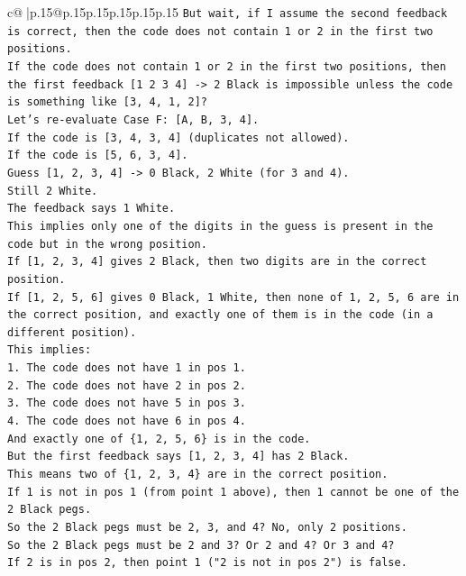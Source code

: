\documentclass{article}
\begin{document}
{\begin{supertabular}{c@{$\;$}|p{.15\linewidth}@{}p{.15\linewidth}p{.15\linewidth}p{.15\linewidth}p{.15\linewidth}p{.15\linewidth}}
{{{\texttt{But wait, if I assume the second feedback is correct, then the code does not contain 1 or 2 in the first two positions.} \\
\texttt{If the code does not contain 1 or 2 in the first two positions, then the first feedback {[}1 2 3 4{]} {-}> 2 Black is impossible unless the code is something like {[}3, 4, 1, 2{]}?} \\
\texttt{Let's re{-}evaluate Case F: {[}A, B, 3, 4{]}.} \\
\texttt{If the code is {[}3, 4, 3, 4{]} (duplicates not allowed).} \\
\texttt{If the code is {[}5, 6, 3, 4{]}.} \\
\texttt{Guess {[}1, 2, 3, 4{]} {-}> 0 Black, 2 White (for 3 and 4).} \\
\texttt{Still 2 White.} \\
\texttt{The feedback says 1 White.} \\
\texttt{This implies only one of the digits in the guess is present in the code but in the wrong position.} \\
\texttt{If {[}1, 2, 3, 4{]} gives 2 Black, then two digits are in the correct position.} \\
\texttt{If {[}1, 2, 5, 6{]} gives 0 Black, 1 White, then none of 1, 2, 5, 6 are in the correct position, and exactly one of them is in the code (in a different position).} \\
\texttt{This implies:} \\
\texttt{1. The code does not have 1 in pos 1.} \\
\texttt{2. The code does not have 2 in pos 2.} \\
\texttt{3. The code does not have 5 in pos 3.} \\
\texttt{4. The code does not have 6 in pos 4.} \\
\texttt{And exactly one of \{1, 2, 5, 6\} is in the code.} \\
\texttt{But the first feedback says {[}1, 2, 3, 4{]} has 2 Black.} \\
\texttt{This means two of \{1, 2, 3, 4\} are in the correct position.} \\
\texttt{If 1 is not in pos 1 (from point 1 above), then 1 cannot be one of the 2 Black pegs.} \\
\texttt{So the 2 Black pegs must be 2, 3, and 4? No, only 2 positions.} \\
\texttt{So the 2 Black pegs must be 2 and 3? Or 2 and 4? Or 3 and 4?} \\
\texttt{If 2 is in pos 2, then point 1 ("2 is not in pos 2") is false.} \\
}}}
\end{supertabular}}
\end{document}
